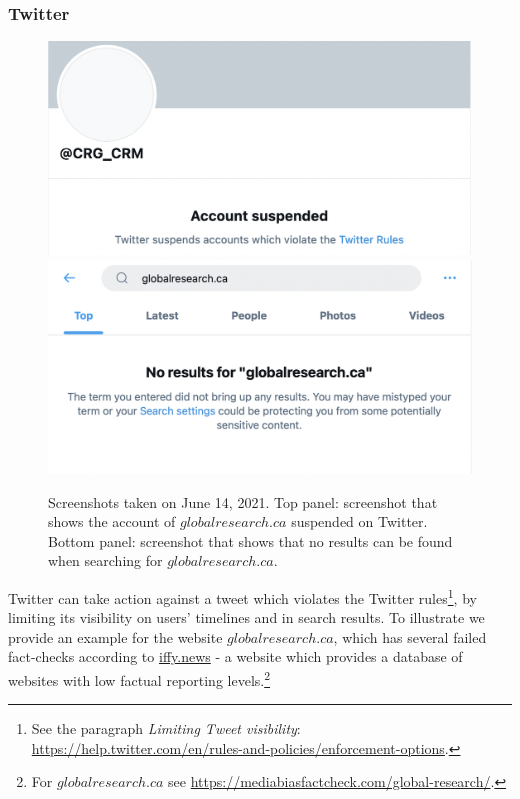 \documentclass{article}
\begin{document}
\subsubsection{Twitter} 

\begin{figure}
	\centering
			\includegraphics[scale=0.35]{./img/globalresearch_2021-06-14.png}
			\includegraphics[scale=0.35]{./img/globalresearch_14_06_2021_16pm_UTC.png} 
		\caption{Screenshots taken on June 14, 2021. Top panel: screenshot that shows the account of $globalresearch.ca$ suspended on Twitter. Bottom panel: screenshot that shows that no results can be found when searching for $globalresearch.ca$.    }
		\label{fig3}
\end{figure}

Twitter can take action against a tweet which violates the Twitter rules\footnote{See the paragraph {\it Limiting Tweet visibility}: \href{https://help.twitter.com/en/rules-and-policies/enforcement-options}{https://help.twitter.com/en/rules-and-policies/enforcement-options}.}, by limiting its visibility on users' timelines and in search results. To illustrate we provide an example for the website $globalresearch.ca$, which has several failed fact-checks according to \href{https://iffy.news}{iffy.news} - a website which provides a database of websites with low factual reporting levels.\footnote{For $globalresearch.ca$ see \href{https://mediabiasfactcheck.com/global-research/}{https://mediabiasfactcheck.com/global-research/}.}
\end{document}
